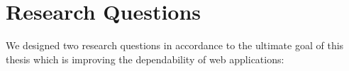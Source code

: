 %
%
\section{Research Questions} \label{Sec:researchq}
We designed two research questions in accordance to the ultimate goal of this thesis which is improving the dependability of \javascript web applications:


